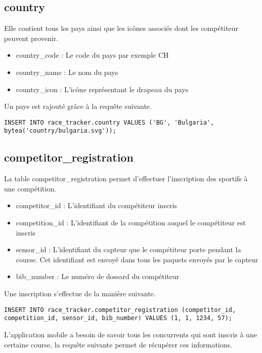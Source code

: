 \subsection{country}

Elle contient tous les pays ainsi que les icônes associés dont les compétiteur peuvent provenir.

\begin{itemize}
\item country\_code : Le code du pays par exemple CH
\item country\_name : Le nom du pays
\item country\_icon :  L'icône représentant le drapeau du pays
\end{itemize}

Un pays est rajouté grâce à la requête suivante.

\begin{lstlisting}[style=SQLStyle]
INSERT INTO race_tracker.country VALUES ('BG', 'Bulgaria', bytea('country/bulgaria.svg'));
\end{lstlisting}

\subsection{competitor\_registration}

La table competitor\_registration permet d'effectuer l'inscription des sportifs à une compétition.

\begin{itemize}
\item competitor\_id : L'identifiant du compétiteur inscris
\item competition\_id : L'identifiant de la compétition auquel le compétiteur est inscris
\item sensor\_id : L'identifiant du capteur que le compétiteur porte pendant la course. Cet identifiant est envoyé dans tous les paquets envoyés par le capteur
\item bib\_number : Le numéro de dossard du compétiteur
\end{itemize}

Une inscription s'effectue de la manière suivante.

\begin{lstlisting}[style=SQLStyle]
INSERT INTO race_tracker.competitor_registration (competitor_id, competition_id, sensor_id, bib_number) VALUES (1, 1, 1234, 57);
\end{lstlisting}

L'application mobile a besoin de savoir tous les concurrents qui sont inscris à une certaine course, la requête suivante permet de récupérer ces informations.

